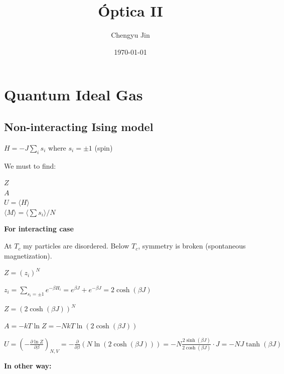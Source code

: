 \documentclass[12pt,a4paper]{report}
\title{Óptica II}
\author{Chengyu Jin}
\date{\today}
\newcommand{\esp}{\vspace{0.5cm}}
\begin{document}
	
	\maketitle
	
	\tableofcontents
	\newpage
	
	\chapter{Quantum Ideal Gas}
	
	\section{Non-interacting Ising model}
	
	\noindent $H = -J \sum_{i} s_i$ where $s_i = \pm 1$ (spin)
	
	\esp
	
	\noindent We must to find:
	
	\esp
	
	\noindent $Z$ \\
	\noindent $A$ \\
	\noindent $U = \langle H \rangle$ \\
	\noindent $\langle M \rangle = \langle \sum s_i \rangle / N$
	
	\esp
	
	\noindent \textbf{For interacting case}
	
	\esp
	
	At $T_c$ my particles are disordered. Below $T_c$, symmetry is broken (spontaneous magnetization).
	
	\esp
	
	$Z = (z_i)^N$ 
	
	\esp
	
	$z_i = \sum_{s_i = \pm 1} e^{-\beta H_i} = e^{\beta J} + e^{-\beta J} = 2\cosh(\beta J)$
	
	\esp
	
	$Z = (2\cosh(\beta J))^N$
	
	\esp
	
	$A = -kT \ln Z = -NkT \ln(2\cosh(\beta J))$
	
	\esp
	
	$U = \left( -\frac{\partial \ln Z}{\partial \beta} \right)_{N, V} = -\frac{\partial}{\partial \beta} (N \ln(2\cosh(\beta J))) = -N \frac{2\sinh(\beta J)}{2\cosh(\beta J)} \cdot J = -NJ \tanh(\beta J)$
	
	\esp
	
	\noindent \textbf{In other way:}
	
	\esp
	
\end{document}
